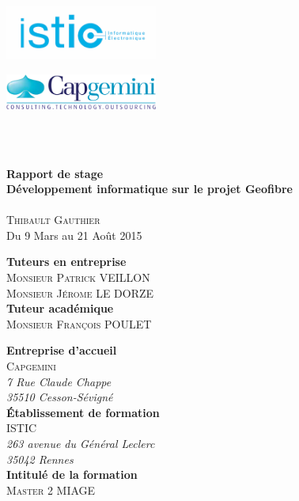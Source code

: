 \begin{titlepage}
  \begin{minipage}[t]{7cm} %
    \flushleft \includegraphics[width = 5cm]{images/logo_istic.png}
  \end{minipage}
  \hfill
  \begin{minipage}[t]{7cm}
    \flushright \includegraphics[width = 5cm]{images/logo_capgemini.png}
  \end{minipage}
  \\[2cm]
  \begin{center}
    \hr\\[0.5cm]
    {\huge\textbf{Rapport de stage }}\\[0.4cm]
    {\large\textbf{Développement informatique sur le projet Geofibre}}\\[0.4cm]
    \hr\\[0.5cm]
    \textsc{Thibault Gauthier}\\[0.4cm]
    Du 9 Mars au 21 Août 2015\\[2.5cm]
  \end{center}
  \begin{minipage}[t]{8cm} %
    \textbf{Tuteurs en entreprise}\\
    \textsc{Monsieur Patrick VEILLON\\Monsieur Jérome LE DORZE}\\[0.5cm]
    \textbf{Tuteur académique}\\
    \textsc{Monsieur François POULET}
  \end{minipage}
  \hfill
  \begin{minipage}[t]{8cm}
    \textbf{Entreprise d'accueil} \\
    \textsc{Capgemini}\\
    \textit{7 Rue Claude Chappe\\
    35510 Cesson-Sévigné}\\[0.5cm]
    \textbf{\'Etablissement de formation}\\
    \textsc{ISTIC\footnotemark}\\
    \textit{263 avenue du Général Leclerc\\
    35042 Rennes}\\[0.5cm]
    \textbf{Intitulé de la formation}\\
    \textsc{Master 2 MIAGE\footnotemark}

  \end{minipage}
  \addtocounter{footnote}{-2} %

\end{titlepage}
